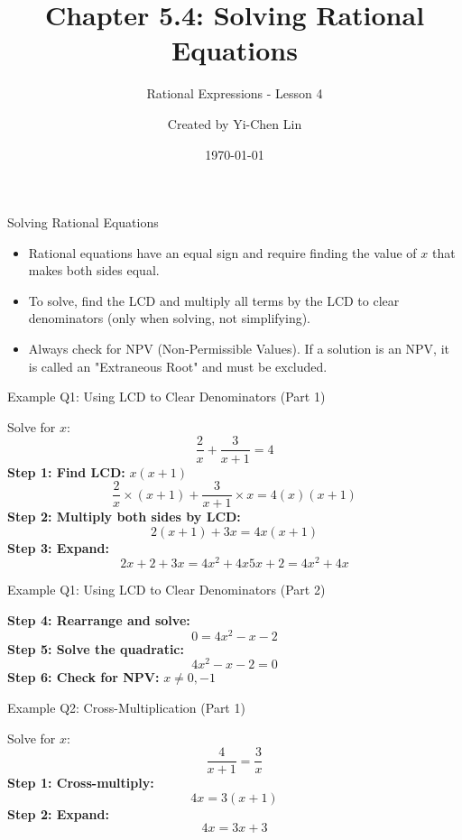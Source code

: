 \documentclass[aspectratio=169]{beamer}
\title{Chapter 5.4: Solving Rational Equations}
\subtitle{Rational Expressions - Lesson 4}
\author{Created by Yi-Chen Lin}
\date{\today}
\begin{document}
\begin{frame}
\titlepage
\end{frame}

\begin{frame}{Solving Rational Equations}
\begin{tcolorbox}[colback=lightgray,colframe=primary,title=Key Concepts]
\footnotesize
\begin{itemize}
  \item Rational equations have an equal sign and require finding the value of $x$ that makes both sides equal.
  \item To solve, find the LCD and multiply all terms by the LCD to clear denominators (only when solving, not simplifying).
  \item Always check for NPV (Non-Permissible Values). If a solution is an NPV, it is called an "Extraneous Root" and must be excluded.
\end{itemize}
\end{tcolorbox}
\end{frame}

\begin{frame}{Example Q1: Using LCD to Clear Denominators (Part 1)}
\begin{tcolorbox}[colback=lightgray,colframe=secondary,title=Example Q1 (Part 1)]
\footnotesize
Solve for $x$:
\[
\frac{2}{x} + \frac{3}{x+1} = 4
\]
\textbf{Step 1: Find LCD:} $x(x+1)$
\[
\frac{2}{x} \times (x+1) + \frac{3}{x+1} \times x = 4(x)(x+1)
\]
\textbf{Step 2: Multiply both sides by LCD:}
\[
2(x+1) + 3x = 4x(x+1)
\]
\textbf{Step 3: Expand:}
\[
2x+2+3x = 4x^2+4x
5x+2 = 4x^2+4x
\]
\end{tcolorbox}
\end{frame}

\begin{frame}{Example Q1: Using LCD to Clear Denominators (Part 2)}
\begin{tcolorbox}[colback=lightgray,colframe=secondary,title=Example Q1 (Part 2)]
\footnotesize
\textbf{Step 4: Rearrange and solve:}
\[
0 = 4x^2-x-2
\]
\textbf{Step 5: Solve the quadratic:}
\[
4x^2-x-2=0
\]
\textbf{Step 6: Check for NPV:} $x \neq 0, -1$
\end{tcolorbox}
\end{frame}

\begin{frame}{Example Q2: Cross-Multiplication (Part 1)}
\begin{tcolorbox}[colback=lightgray,colframe=secondary,title=Example Q2 (Part 1)]
\footnotesize
Solve for $x$:
\[
\frac{4}{x+1} = \frac{3}{x}
\]
\textbf{Step 1: Cross-multiply:}
\[
4x = 3(x+1)
\]
\textbf{Step 2: Expand:}
\[
4x = 3x + 3
\]
\end{tcolorbox}
\end{frame}
\end{document}
